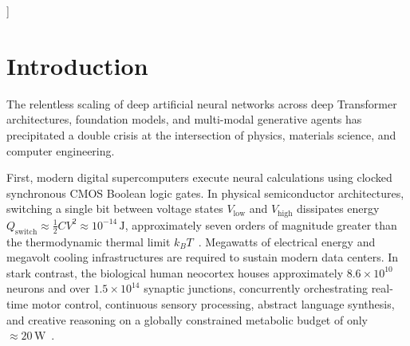 \documentclass[10pt,twocolumn,3p]{article}
\begin{document}
\begin{@twocolumnfalse}
\begin{abstract}
    In PyTorch native implementation, we introduce Daleckii-Krein matrix spectral Fr\'echet derivatives with normalized \texttt{sinc} kernels to unconditionally bypass numerical division-by-zero singularities during autograd backpropagation. We provide empirical verification across eight comprehensive benchmarks, including 1024-shot trapped-ion native gate compilation and noise-calibrated execution targeting IonQ hardware primitives achieving a Bhattacharyya state fidelity of $\mathcal{F} = 0.999828$ and Pearson correlation $r = 0.997888$ via an optimal 2-pulse M\o lmer-S\o rensen decomposition of continuous $XY$ resonance, dedicated validation of dialectical frontiers and contextuality saturation, and biophysical CSF shielding stress tests (modeling meningitis, hydrocephalus, and lumbar puncture recovery). Epistemologically, we maintain a strict scientific demarcation: while Theorems 1--8 are exact mathematical results proven in Hilbert and Banach operator spaces and empirically verified in \texttt{quanta.torch.brain}, their biological and clinical corollaries are formulated as biomorphic mathematical isomorphisms and falsifiable neurophysical hypotheses rather than established clinical wetware mechanisms. Finally, we present an exhaustive dialectical adversarial synthesis resolving the five foundational quantum brain questions (decoherence carrier, qubit capacity, quantum advantage, consensus collapse without external observers, and scaling to foundation models via the Entanglement Area Law and Matrix Product States with $\chi \le 16$).
    \end{abstract}
    \vspace{1.5em}
  \end{@twocolumnfalse}
]

\section{Introduction}
\label{sec:introduction}

The relentless scaling of deep artificial neural networks across deep Transformer architectures, foundation models, and multi-modal generative agents has precipitated a double crisis at the intersection of physics, materials science, and computer engineering. 

First, modern digital supercomputers execute neural calculations using clocked synchronous CMOS Boolean logic gates. In physical semiconductor architectures, switching a single bit between voltage states $V_{\text{low}}$ and $V_{\text{high}}$ dissipates energy $Q_{\text{switch}} \approx \frac{1}{2} C V^2 \approx 10^{-14}\,\text{J}$, approximately seven orders of magnitude greater than the thermodynamic thermal limit $k_B T$~\cite{landauer1961,bennett1982}. Megawatts of electrical energy and megavolt cooling infrastructures are required to sustain modern data centers. In stark contrast, the biological human neocortex houses approximately $8.6 \times 10^{10}$ neurons and over $1.5 \times 10^{14}$ synaptic junctions, concurrently orchestrating real-time motor control, continuous sensory processing, abstract language synthesis, and creative reasoning on a globally constrained metabolic budget of only $\approx 20\,\text{W}$~\cite{kass1988,friston2010}.
\end{document}
